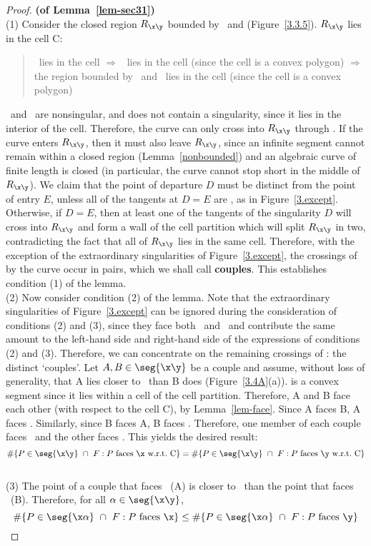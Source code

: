 \begin{proof}{\bf (of Lemma~\ref{lem-sec31})}\\
(1) Consider the closed region $R_{\x\y}$ bounded by \seg{\x\y}\ and 
%
%
\arc{\x\y} (Figure~\ref{3.3.5}).
$R_{\x\y}$ lies in the cell C:\nopagebreak
\begin{quote}\nopagebreak
\arc{\x\y}\ lies in the cell $\Rightarrow$
\seg{\x\y}\ lies in the cell (since the cell is a convex polygon)
$\Rightarrow$ the region bounded
by \arc{\x\y}\ and \seg{\x\y}\ lies in the cell (since the 
cell is a convex polygon)
\end{quote}
\x\ and \y\ are nonsingular, and
\arc{\x\y} does not contain a singularity, since it lies in the
interior of the cell.
Therefore, the curve can only cross into $R_{\x\y}$ through \seg{\x\y}.
If the curve enters $R_{\x\y}$, then it must also leave $R_{\x\y}$, since 
an infinite segment cannot remain within a 
closed region (Lemma~\ref{nonbounded}) and an algebraic curve of finite
length is closed (in particular, the curve cannot stop short in the middle of 
$R_{\x\y}$).
We claim that the 
point of departure $D$ must be distinct from the point of entry $E$,
unless all of the tangents 
at $D=E$ are , as in Figure~\ref{3.except}.
Otherwise, if $D=E$, then at least one of 
the tangents of the singularity $D$ will cross into $R_{\x\y}$ and
form a wall of the cell partition which will split $R_{\x\y}$ in two, 
contradicting the fact that all of $R_{\x\y}$ lies in the same cell.
Therefore, with the exception of the extraordinary singularities of
Figure~\ref{3.except},
the crossings of \seg{\x\y} by the curve
occur in pairs, which we shall call {\bf couples}.
This establishes condition (1) of the 
%
%
lemma.\\
(2) Now consider condition (2) of the lemma.
Note that the extraordinary singularities of
Figure~\ref{3.except} can be ignored during the consideration of conditions
(2) and (3), since they face both \x\ and \y\ and contribute the same
amount to the left-hand side and right-hand side of the expressions
of conditions (2) and (3).
Therefore, we can concentrate on the remaining crossings of \seg{\x\y}:
the distinct `couples'.
Let $A,B\in \seg{\x\y}$ be a couple and 
assume, without loss of generality, that A lies closer to \x\ than B does
(Figure~\ref{3.4A}(a)).
 is a convex segment since it lies within a cell of the cell
partition.
Therefore, A and B face each other (with respect to the cell C), by 
Lemma~\ref{lem-face}.
Since A faces B, A faces \y.
Similarly, since B faces A, B faces \x.
Therefore, one member of each couple faces \x\ and the other faces \y.
This yields the desired result:
\[ \#\{P \in \seg{\x\y}\ \cap\ F: P \mbox{ faces \x\ w.r.t.\ C}\} = 
\#\{P \in \seg{\x\y}\ \cap\ F: P \mbox{ faces \y\ w.r.t.\ C}\} \]
%
%
\ \\
(3) The point of a couple that faces \y\ (A)
is closer to \x\ than the point that faces \x\ (B).
Therefore, for all $\alpha \in \seg{\x\y}$,
\[ \#\{P \in\seg{\x\alpha}\ \cap\ F: P \mbox{ faces \x}\} \leq
\#\{P \in \seg{\x\alpha}\ \cap\ F: P \mbox{ faces \y}\} \]
\end{proof}
